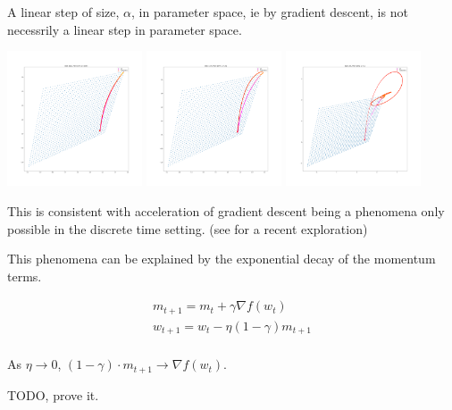 A linear step of size, \(\alpha\), in parameter space, ie by gradient
descent, is not necessrily a linear step in parameter space.

\includegraphics[width=0.3\textwidth,height=0.25\textheight]{../../pictures/figures/vi_sgd-vs-vi_mom_0001.png}
\includegraphics[width=0.3\textwidth,height=0.25\textheight]{../../pictures/figures/vi_sgd-vs-vi_mom_001.png}
\includegraphics[width=0.3\textwidth,height=0.25\textheight]{../../pictures/figures/vi_sgd-vs-vi_mom_01.png}

This is consistent with acceleration of gradient descent being a phenomena only possible in the discrete time setting. (see \cite{Betancourt2018} for a recent exploration)

This phenomena can be explained by the exponential decay of the momentum terms.

\begin{align}
m_{t+1} = m_t + \gamma\nabla f(w_t) \\
w_{t+1} = w_t - \eta (1-\gamma) m_{t+1} \\
\end{align}

As \(\eta \to 0\), \((1-\gamma) \cdot m_{t+1} \to \nabla f(w_t)\).

TODO, prove it.

